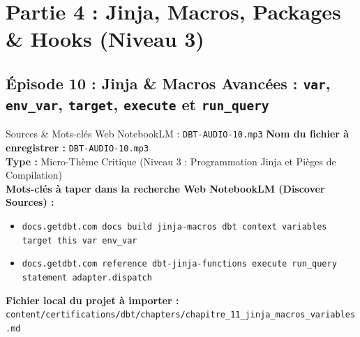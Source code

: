 \documentclass[11pt,a4paper]{article}
\begin{document}
\newpage

\section{Partie 4 : Jinja, Macros, Packages \& Hooks (Niveau 3)}

\subsection{Épisode 10 : Jinja \& Macros Avancées : \texttt{var}, \texttt{env\_var}, \texttt{target}, \texttt{execute} et \texttt{run\_query}}
\begin{sourcebox}{Sources \& Mots-clés Web NotebookLM : \texttt{DBT-AUDIO-10.mp3}}
\textbf{Nom du fichier à enregistrer :} \texttt{DBT-AUDIO-10.mp3}\\
\textbf{Type :} Micro-Thème Critique (Niveau 3 : Programmation Jinja et Pièges de Compilation)\\
\textbf{Mots-clés à taper dans la recherche Web NotebookLM (Discover Sources) :}
\begin{itemize}[noitemsep]
    \item \texttt{docs.getdbt.com docs build jinja-macros dbt context variables target this var env_var}
    \item \texttt{docs.getdbt.com reference dbt-jinja-functions execute run_query statement adapter.dispatch}
\end{itemize}
\textbf{Fichier local du projet à importer :}
\texttt{content/certifications/dbt/chapters/chapitre_11_jinja_macros_variables.md}
\end{sourcebox}
\end{document}
